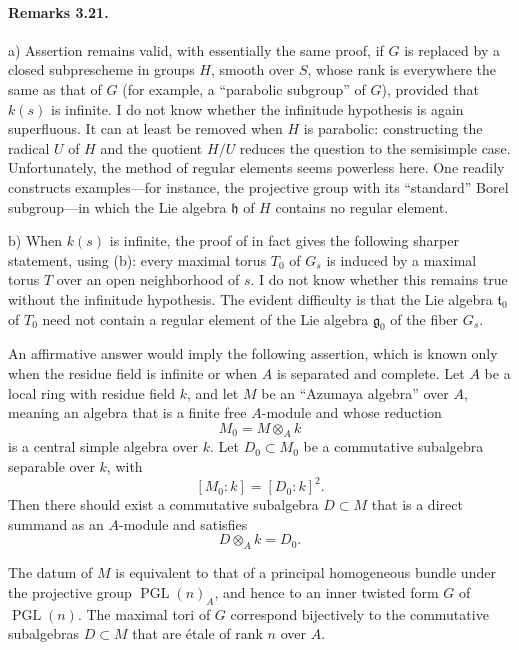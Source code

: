 \paragraph{\textbf{Remarks 3.21.}}
\textup{a)}
Assertion  remains valid, with essentially the same proof, if
\(G\) is replaced by a closed subprescheme in groups \(H\), smooth
over \(S\), whose rank is everywhere the same as that of \(G\)
\textup{(for example, a ``parabolic subgroup'' of \(G\))}, provided
that \(k(s)\) is infinite. I do not know whether the infinitude
hypothesis is again superfluous. It can at least be removed when
\(H\) is parabolic: constructing the radical \(U\) of \(H\) and
the quotient \(H/U\) reduces the question to the semisimple case.
Unfortunately, the method of regular elements seems powerless
here. One readily constructs examples---for instance, the
projective group with its ``standard'' Borel subgroup---in which
the Lie algebra \(\mathfrak h\) of \(H\) contains no regular
element.

\smallskip
\noindent
\textup{b)}
When \(k(s)\) is infinite, the proof of  in fact gives the
following sharper statement, using \textup{(b)}: every maximal
torus \(T_0\) of \(G_s\) is induced by a maximal torus \(T\) over
an open neighborhood of \(s\). I do not know whether this remains
true without the infinitude hypothesis. The evident difficulty is
that the Lie algebra \(\mathfrak t_0\) of \(T_0\) need not contain
a regular element of the Lie algebra \(\mathfrak g_0\) of the
fiber \(G_s\).

An affirmative answer would imply the following assertion, which
is known only when the residue field is infinite or when \(A\) is
separated and complete. Let \(A\) be a local ring with residue
field \(k\), and let \(M\) be an ``Azumaya algebra'' over \(A\),
meaning an algebra that is a finite free \(A\)-module and whose
reduction
\[
  M_0=M\otimes_A k
\]
is a central simple algebra over \(k\). Let \(D_0\subset M_0\) be
a commutative subalgebra separable over \(k\), with
\[
  [M_0:k]=[D_0:k]^2.
\]
Then there should exist a commutative subalgebra \(D\subset M\)
that is a direct summand as an \(A\)-module and satisfies
\[
  D\otimes_A k=D_0.
\]

The datum of \(M\) is equivalent to that of a principal homogeneous
bundle under the projective group \(\operatorname{PGL}(n)_A\), and
hence to an inner twisted form \(G\) of \(\operatorname{PGL}(n)\).
The maximal tori of \(G\) correspond bijectively to the commutative
subalgebras \(D\subset M\) that are étale of rank \(n\) over \(A\).

